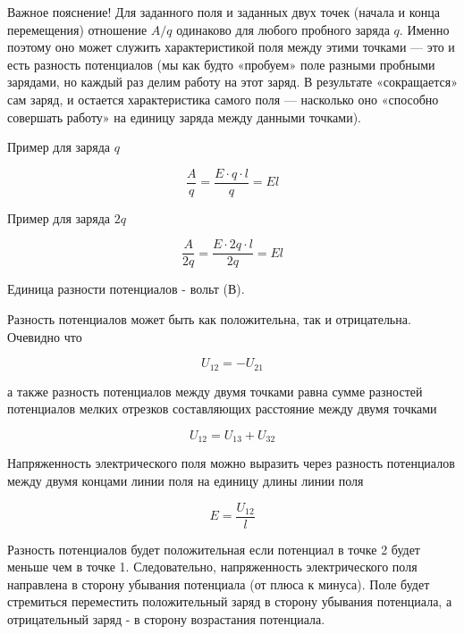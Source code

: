 \documentclass[a4paper,12pt]{article}
\begin{document}
		Важное пояснение!
		Для заданного поля и заданных двух точек (начала и конца перемещения) отношение $A/q$
		одинаково для любого пробного заряда $q$. Именно поэтому оно может служить характеристикой
		поля между этими точками — это и есть разность потенциалов
		(мы как будто «пробуем» поле разными пробными зарядами, но каждый раз делим работу на
		этот заряд. В результате «сокращается» сам заряд, и остается характеристика самого поля
		— насколько оно «способно совершать работу» на единицу заряда между данными точками).
		
		Пример для заряда $q$

		\begin{equation*}
			\frac{A}{q} = \frac{E \cdot q \cdot l}{q} = El
		\end{equation*}

		Пример для заряда $2q$

		\begin{equation*}
			\frac{A}{2q} = \frac{E \cdot 2q \cdot l}{2q} = El
		\end{equation*}

		Единица разности потенциалов - вольт (В).

		Разность потенциалов может быть как положительна, так и отрицательна. Очевидно что

		\begin{equation*}
			U_{12} = -U_{21}
		\end{equation*}

		а также разность потенциалов между двумя точками равна сумме разностей потенциалов 
		мелких отрезков составляющих расстояние между двумя точками

		\begin{equation*}
			U_{12} = U_{13} + U_{32}
		\end{equation*}

		Напряженность электрического поля можно выразить через разность потенциалов 
		между двумя концами линии поля на единицу длины линии поля

		\begin{equation}
			E = \frac{U_{12}}{l}
			\label{eq:f6}
		\end{equation}

		Разность потенциалов будет положительная если потенциал в точке 2 будет
		меньше чем в точке 1. Следовательно, напряженность электрического поля 
		направлена в сторону убывания потенциала (от плюса к минуса). Поле будет 
		стремиться переместить положительный заряд в сторону убывания потенциала, 
		а отрицательный заряд - в сторону возрастания потенциала.
\end{document}
